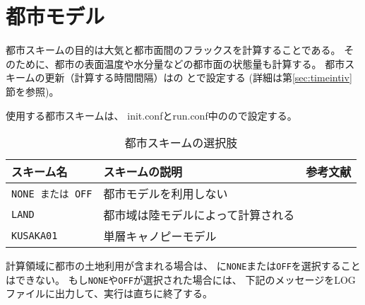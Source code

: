 \section{都市モデル} \label{sec:basic_usel_urban}
都市スキームの目的は大気と都市面間のフラックスを計算することである。
そのために、都市の表面温度や水分量などの都市面の状態量も計算する。
都市スキームの更新（計算する時間間隔）はの
とで設定する
(詳細は第\ref{sec:timeintiv}節を参照)。


使用する都市スキームは、
init.confとrun.conf中のので設定する。


\begin{table}[h]
\begin{center}
  \caption{都市スキームの選択肢}
  \label{tab:nml_urban}
  \begin{tabularx}{150mm}{llX} \hline
    \rowcolor[gray]{0.9}  スキーム名  & スキームの説明 &  参考文献 \\ \hline
      \verb|NONE または OFF|   & 都市モデルを利用しない                      \\
      \verb|LAND|              & 都市域は陸モデルによって計算される            \\
      \verb|KUSAKA01|          & 単層キャノピーモデル  & \citet{kusaka_2001} \\
    \hline
  \end{tabularx}
\end{center}
\end{table}

計算領域に都市の土地利用が含まれる場合は、
に\verb|NONE|または\verb|OFF|を選択することはできない。
もし\verb|NONE|や\verb|OFF|が選択された場合には、
下記のメッセージをLOGファイルに出力して、実行は直ちに終了する。
%


